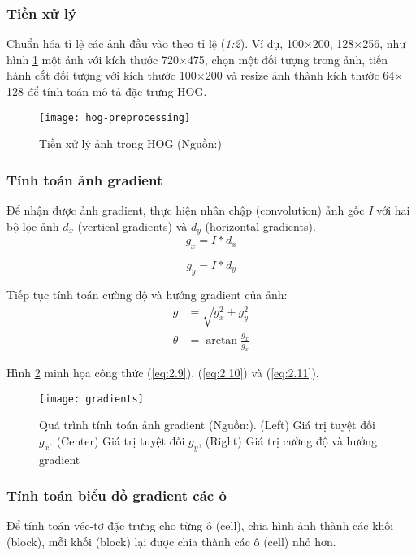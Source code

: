 \subsubsection{Tiền xử lý}
Chuẩn hóa tỉ lệ các ảnh đầu vào theo tỉ lệ (\emph{1:2}). Ví dụ, 100$\times$200, 128$\times$256, như hình \ref{fig:hog-prep} một ảnh với kích thước 720$\times$475, chọn một đối tượng trong ảnh, tiến hành cắt đối tượng với kích thước 100$\times$200 và resize ảnh thành kích thước 64$\times$128 để tính toán mô tả đặc trưng HOG.
\begin{figure}[h]
	\centering
	\texttt{[image: hog-preprocessing]}
	\caption[Tiền xử lý ảnh trong HOG]{Tiền xử lý ảnh trong HOG (Nguồn:\cite{learnopencv})}
	\label{fig:hog-prep}
\end{figure}

\subsubsection{Tính toán ảnh gradient}
Để nhận được ảnh gradient, thực hiện nhân chập (convolution) ảnh gốc \emph{I} với hai bộ lọc ảnh $d_x$ (vertical gradients) và $d_y$ (horizontal gradients).
\begin{equation}\label{eq:2.9}
 g_x = I * d_x
\end{equation}

\begin{equation}\label{eq:2.10}
 g_y  = I * d_y
\end{equation}

Tiếp tục tính toán cường độ và hướng gradient của ảnh:
\begin{equation}\label{eq:2.11}
\begin{split}
	g &= \sqrt{g_x^2 + g_y^2}\\
	\theta & = \arctan \frac{g_x}{g_x}
\end{split}
\end{equation}

Hình \ref{fig:gradient} minh họa công thức (\ref{eq:2.9}), (\ref{eq:2.10}) và (\ref{eq:2.11}).
\begin{figure}[h]
	\centering
	\texttt{[image: gradients]}
	\caption[Quá trình tính toán ảnh gradient]{Quá trình tính toán ảnh gradient (Nguồn:\cite{learnopencv}). (Left) Giá trị tuyệt đối $g_x$. (Center) Giá trị tuyệt đối $g_y$, (Right) Giá trị cường độ và hướng gradient }
	\label{fig:gradient}
\end{figure}
 
\subsubsection{Tính toán biểu đồ gradient các ô}
Để tính toán véc-tơ đặc trưng cho từng ô (cell), chia hình ảnh thành các khối (block), mỗi khối (block) lại được chia thành các ô (cell) nhỏ hơn. \par

